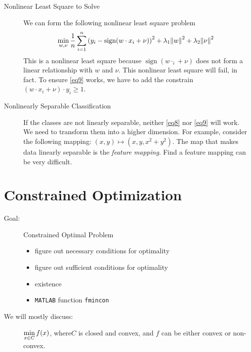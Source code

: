 \begin{description}
\begin{prf}
	\end{prf}
	\item[Nonlinear Least Square to Solve] We can form the following nonlinear least square problem \begin{equation}\label{eq9}\min_{w,\nu}\dfrac{1}{n}\sum_{i=1}^n\qty(y_i-\operatorname{sign}(w\cdot x_i+\nu))^2+\lambda_1\norm{w}^2+\lambda_2\norm{\nu}^2\end{equation} This is a nonlinear least square because $\operatorname{sign}(w\cdot _i+\nu)$ does not form a linear relationship with $w$ and $\nu$. This nonlinear least square will fail, in fact. To ensure \eqref{eq9} works, we have to add the constrain $(w\cdot x_i+\nu)\cdot y_i\geq1$.
	\item[Nonlinearly Separable Classification] If the classes are not linearly separable, neither \eqref{eq8} nor \eqref{eq9} will work. We need to transform them into a higher dimension. For example, consider the following mapping: $(x,y)\mapsto(x,y,x^2+y^2)$. The map that makes data linearly separable is the \textit{feature mapping}. Find a feature mapping can be very difficult. 
\end{description}

\newpage
\section{Constrained Optimization}
\begin{description}
	\item[Goal:] Constrained Optimal Problem
	\begin{itemize}
		\item figure out necessary conditions for optimality
		\item figure out sufficient conditions for optimality
		\item existence
		\item \texttt{MATLAB} function \texttt{fmincon}
	\end{itemize}
	\item[We will mostly discuss:] $\displaystyle\min_{x\in C}f(x)$, where$C$ is closed and convex, and $f$ can be either convex or non-convex. 
\end{description}
